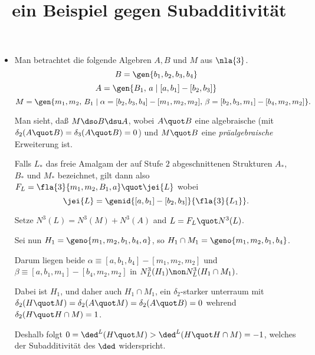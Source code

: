 \documentclass[english,german,11pt]{article}
\title{ein Beispiel gegen Subadditivit\"at}
\author{}
\date{}
\begin{document}
\maketitle
\begin{itemize}
\item[] Man betrachtet die folgende Algebren $A,B$ und $M$ aus $\nla{3}$.
$$B=\gen{b_{1},b_{2},b_{3},b_{4}}$$
$$A=\gen{B_{1},\,a\mid[a,b_{1}]-[b_{2},b_{3}]}$$
$$M=\gen{m_{1},m_{2},\,B_{1}\mid\alpha=[b_{2},b_{3},b_{4}]-[m_{1},m_{2},m_{2}],\,\beta=[b_{2},b_{3},m_{1}]-[b_{4},m_{2},m_{2}]}.$$

Man sieht, da{\ss} $M\dso B\dsu A$, wobei $A\quot B$ eine algebraische
(mit $\delta_{2}(A\quot B)=\delta_{3}(A\quot B)=0$) und
$M\quot B$ eine \emph{pr\"aalgebraische}  Erweiterung ist.

Falls $L_{*}$ das freie Amalgam der auf Stufe $2$ abgeschnittenen Strukturen $A_{*}$,
$B_{*}$ und $M_{*}$ bezeichnet, gilt dann also $F_{L}=\fla{3}{m_{1},m_{2},B_{1},a}
\quot\jei{L}$ wobei
$$\jei{L}=\genid{[a,b_{1}]-[b_{2},b_{3}]}{\fla{3}{L_{1}}}.$$

Setze $N^{3}(L)=N^{3}(M)+N^{3}(A)$ and $L=F_{L}\quot N^{3}(L)$.

Sei nun $H_{1}=\geno{m_{1},m_{2},b_{1},b_{4},a}$, so $H_{1}\cap M_{1}=\geno{m_{1},m_{2},b_{1},b_{4}}$.

Darum liegen beide $\alpha\equiv[a,b_{1},b_{4}]-[m_{1},m_{2},m_{2}]$
und $\beta\equiv[a,b_{1},m_{1}]-[b_{4},m_{2},m_{2}]$ in $N_{L}^{3}(H_{1})\non N_{L}^{3}(H_{1}\cap M_{1})$.

Dabei ist $H_{1}$, und daher auch $H_{1}\cap M_{1}$, ein $\delta_{2}$-starker unterraum
mit $\delta_{2}(H\quot M)=\delta_{2}(A\quot M)=\delta_{2}(A\quot B)=0$ wehrend
$\delta_{2}(H\quot H\cap M)=1$.

Deshalb folgt $0=\ded^{L}(H\quot M)>\ded^{L}(H\quot H\cap M)=-1$, welches
der Subadditivit\"at des $\ded$ widerspricht.

\end{itemize}
\end{document}
